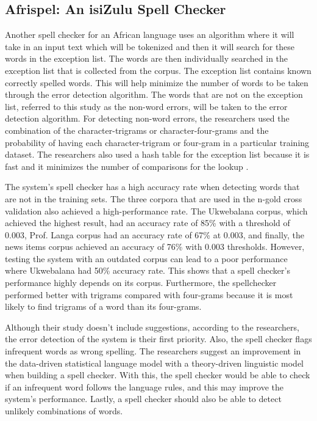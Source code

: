 \documentclass[12pt]{book}
\begin{document}
\subsection{Afrispel: An isiZulu Spell Checker}
Another spell checker for an African language uses an algorithm where it will take in an input text which will be tokenized and then it will search for these words in the exception list. The words are then individually searched in the exception list that is collected from the corpus. The exception list contains known correctly spelled words. This will help minimize the number of words to be taken through the error detection algorithm. The words that are not on the exception list, referred to this study as the non-word errors, will be taken to the error detection algorithm. For detecting non-word errors, the researchers used the combination of the character-trigrams or character-four-grams and the probability of having each character-trigram or four-gram in a particular training dataset. The researchers also used a hash table for the exception list because it is fast and it minimizes the number of comparisons for the lookup \cite{ndabaafrispel}.

The system’s spell checker has a high accuracy rate when detecting words that are not in the training sets. The three corpora that are used in the n-gold cross validation also achieved a high-performance rate. The Ukwebalana corpus, which achieved the highest result, had an accuracy rate of 85\% with a threshold of 0.003, Prof. Langa corpus had an accuracy rate of 67\% at 0.003, and finally, the news items corpus achieved an accuracy of 76\% with 0.003 thresholds. However, testing the system with an outdated corpus can lead to a poor performance where Ukwebalana had 50\% accuracy rate. This shows that a spell checker’s performance highly depends on its corpus. Furthermore, the spellchecker performed better with trigrams compared with four-grams because it is most likely to find trigrams of a word than its four-grams.

Although their study doesn’t include suggestions, according to the researchers, the error detection of the system is their first priority. Also, the spell checker flags infrequent words as wrong spelling. The researchers suggest an improvement in the data-driven statistical language model with a theory-driven linguistic model when building a spell checker. With this, the spell checker would be able to check if an infrequent word follows the language rules, and this may improve the system’s performance. Lastly, a spell checker should also be able to detect unlikely combinations of words.
\end{document}
